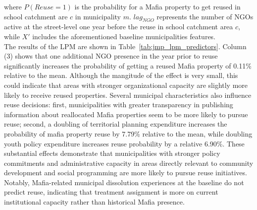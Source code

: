 \documentclass[12pt]{article}
\theoremstyle{plain}
\theoremstyle{plain}
\theoremstyle{plain}
\theoremstyle{definition}
\theoremstyle{plain}
\theoremstyle{definition}
\theoremstyle{plain}
\theoremstyle{remark}
\theoremstyle{definition}
\theoremstyle{definition}
\theoremstyle{plain}
\begin{document}
where $P(Reuse=1)$ is the probability for a Mafia property to get reused in school catchment are $c$ in municipality $m$. $lag_{NGO}$ represents the number of NGOs active at the street-level one year before the reuse in school catchment area $c$, while $X'$ includes the aforementioned baseline municipalities features. \\
The results of the LPM are shown in Table~\ref{tab:jmp_lpm_predictors}. Column (3) shows that one additional NGO presence in the year prior to reuse significantly increases the probability of getting a reused Mafia property of 0.11\% relative to the mean. Although the mangitude of the effect is very small, this could indicate that areas with stronger organizational capacity are slightly more likely to receive reused properties. Several municipal characteristics also influence reuse decisions: first, municipalities with greater transparency in publishing information about reallocated Mafia properties seem to be more likely to pursue reuse; second, a doubling of territorial planning expenditure increases the probability of mafia property reuse by  7.79\%  relative to the mean, while doubling youth policy expenditure increases reuse probability by a relative 6.90\%. These substantial effects demonstrate that municipalities with stronger policy commitments and administrative capacity in areas directly relevant to community development and social programming are more likely to pursue reuse initiatives.  Notably, Mafia-related municipal dissolution experiences at the baseline do not predict reuse, indicating that treatment assignment is more on current institutional capacity rather than historical Mafia presence.\par
\end{document}
